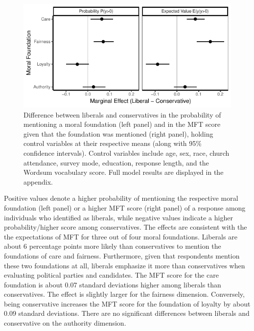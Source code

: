 \documentclass[12pt]{article}
\begin{document}
\begin{figure}[ht]\centering
\includegraphics{../calc/fig/tobit_ideol.pdf}
\caption{Difference between liberals and conservatives in the probability of mentioning a moral foundation (left panel) and in the MFT score given that the foundation was mentioned (right panel), holding control variables at their respective means (along with 95\% confidence intervals). Control variables include age, sex, race, church attendance, survey mode, education, response length, and the Wordsum vocabulary score. Full model results are displayed in the appendix.
}\label{fig:tobit_ideol}
\end{figure}

Positive values denote a higher probability of mentioning the respective moral foundation (left panel) or a higher MFT score (right panel) of a response among individuals who identified as liberals, while negative values indicate a higher probability/higher score among conservatives. The effects are consistent with the the expectations of MFT for three out of four moral foundations. Liberals are about 6 percentage points more likely than conservatives to mention the foundations of care and fairness. Furthermore, given that respondents mention these two foundations at all, liberals emphasize it more than conservatives when evaluating political parties and candidates. The MFT score for the care foundation is about 0.07 standard deviations higher among liberals than conservatives. The effect is slightly larger for the fairness dimension. Conversely, being conservative increases the MFT score for the foundation of loyalty by about 0.09 standard deviations. There are no significant differences between liberals and conservative on the authority dimension.

\end{document}

